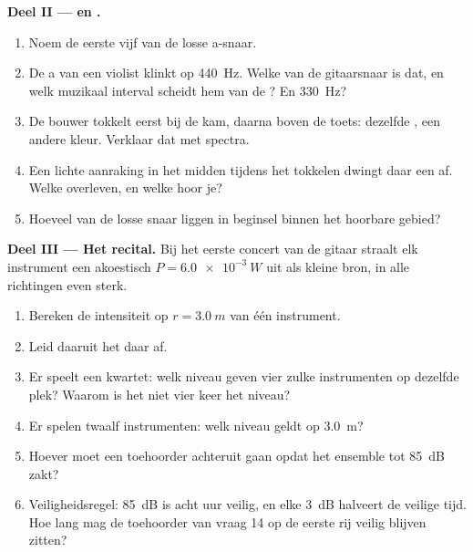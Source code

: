 \begin{problem}
\medskip
\noindent\textbf{Deel II ---  en .}
\begin{enumerate}[resume]
  \item Noem de eerste vijf  van de losse a-snaar.
  \item De a van een violist klinkt op \qty{440}{Hz}. Welke  van
        de gitaarsnaar is dat, en welk muzikaal interval scheidt hem van
        de ? En \qty{330}{Hz}?
  \item De bouwer tokkelt eerst bij de kam, daarna boven de toets:
        dezelfde , een andere kleur. Verklaar dat met spectra.
  \item Een lichte aanraking in het midden tijdens het tokkelen dwingt
        daar een  af. Welke  overleven, en welke
         hoor je?
  \item Hoeveel  van de losse snaar liggen in beginsel binnen
        het hoorbare gebied?
\end{enumerate}

\medskip
\noindent\textbf{Deel III --- Het recital.}
Bij het eerste concert van de gitaar straalt elk instrument een
akoestisch  $P = \qty{6.0e-3}{W}$ uit als kleine bron, in alle
richtingen even sterk.
\begin{enumerate}[resume]
  \item Bereken de intensiteit op $r = \qty{3.0}{m}$ van één instrument.
  \item Leid daaruit het  daar af.
  \item Er speelt een kwartet: welk niveau geven vier zulke instrumenten
        op dezelfde plek? Waarom is het niet vier keer het niveau?
  \item Er spelen twaalf instrumenten: welk niveau geldt op \qty{3.0}{m}?
  \item Hoever moet een toehoorder achteruit gaan opdat het ensemble tot
        \qty{85}{dB} zakt?
  \item Veiligheidsregel: \qty{85}{dB} is acht uur veilig, en elke
        \qty{+3}{dB} halveert de veilige tijd. Hoe lang mag de toehoorder
        van vraag 14 op de eerste rij veilig blijven zitten?
\end{enumerate}


\end{problem}
